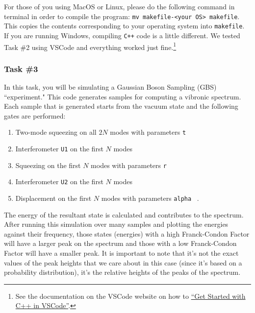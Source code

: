 \documentclass[12pt]{article}
\begin{document}
For those of you using MacOS or Linux, please do the following command in terminal in order to compile the program: \texttt{mv makefile-<your OS> makefile}. This copies the contents corresponding to your operating system into \texttt{makefile}. If you are running Windows, compiling \texttt{C++} code is a little different. We tested Task \#2 using VSCode and everything worked just fine.\footnote{See the documentation on the VSCode website on how to \href{https://code.visualstudio.com/docs/cpp/config-mingw}{``Get Started with C++ in VSCode''}.} 

\subsubsection*{Task \#3}
In this task, you will be simulating a Gaussian Boson Sampling (GBS) ``experiment." This code generates samples for computing a vibronic spectrum. Each sample that is generated starts from the vacuum state and the following gates are performed\cite{killoran2019strawberry, bromley2020applications}:
\begin{enumerate}
\item Two-mode squeezing on all  $2N$  modes with parameters \texttt{t}
\item Interferometer \texttt{U1} on the first $ N$ modes
\item Squeezing on the first $N$ modes with parameters \texttt{r}
\item Interferometer \texttt{U2} on the first  $N$ modes
\item Displacement on the first  $N$ modes with parameters \texttt{alpha} ~.
\end{enumerate}

The energy of the resultant state is calculated and contributes to the spectrum. After running this simulation over many samples and plotting the energies against their frequency, those states (energies) with a high Franck-Condon Factor will have a larger peak on the spectrum and those with a low Franck-Condon Factor will have a smaller peak. It is important to note that it's not the exact values of the peak heights that we care about in this case (since it's based on a probability distribution), it's the relative heights of the peaks of the spectrum.


\hspace{20mm}
\end{document}
